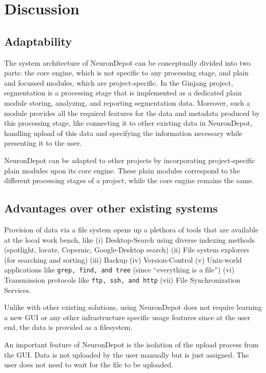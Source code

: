 \documentclass{frontiersSCNS} %
\begin{document}
\section{Discussion}

\subsection{Adaptability}
The system architecture of NeuronDepot can be conceptually divided into two
parts: the core engine, which is not specific to any processing stage, and
plain and focussed modules, which are project-specific. In the Ginjang project,
segmentation is a processing stage that is implemented as a dedicated plain
module storing, analyzing, and reporting segmentation data. Moreover, such a
module provides all the required features for the data and metadata produced by
this processing stage, like connecting it to other existing data in
NeuronDepot, handling upload of this data and specifying the information
necessary while presenting it to the user.

NeuronDepot can be adapted to other projects by incorporating project-specific
plain modules upon its core engine. These plain modules correspond to the
different processing stages of a project, while the core engine
remains the same.

\subsection{Advantages over other existing systems}

Provision of data via a file system opens up a plethora of tools that are
available at the local work bench, like (i) Desktop-Search using diverse
indexing methods (spotlight, locate, Copernic, Google-Desktop search) (ii) File
system explorers (for  searching and sorting) (iii) Backup (iv) Version-Control
(v) Unix-world applications like \texttt{grep, find, and tree} (since
“everything is a file”) (vi) Transmission protocols like \texttt{ftp, ssh, and
http} (vii) File Synchronization Services.

Unlike with other existing solutions, using NeuronDepot does not require
learning a new GUI or any other infrastructure specific usage features since at
the user end, the data is provided as  a filesystem.

An important feature of NeuronDepot is the isolation of the upload process from
the GUI. Data is not uploaded by the user manually but is just assigned. The
user does not need to wait for the file to be uploaded.
\end{document}
